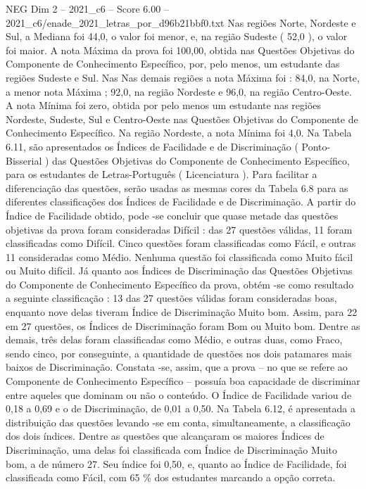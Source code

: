 \begin{textsample}{NEG Dim 2 – 2021\_c6 – Score 6.00 – 2021\_c6/enade\_2021\_letras\_por\_d96b21bbf0.txt}
Nas regiões Norte, Nordeste e Sul, a Mediana foi 44,0, o valor foi menor, e, na região Sudeste ( 52,0 ), o valor foi maior.
A nota Máxima da prova foi 100,00, obtida nas Questões Objetivas do Componente de Conhecimento Específico, por, pelo menos, um estudante das regiões Sudeste e Sul.
Nas Nas demais regiões a nota Máxima foi : 84,0, na Norte, a menor nota Máxima ; 92,0, na região Nordeste e 96,0, na região Centro-Oeste.
A nota Mínima foi zero, obtida por pelo menos um estudante nas regiões Nordeste, Sudeste, Sul e Centro-Oeste nas Questões Objetivas do Componente de Conhecimento Específico.
Na região Nordeste, a nota Mínima foi 4,0.
Na Tabela 6.11, são apresentados os Índices de Facilidade e de Discriminação ( Ponto-Bisserial ) das Questões Objetivas do Componente de Conhecimento Específico, para os estudantes de Letras-Português ( Licenciatura ).
Para facilitar a diferenciação das questões, serão usadas as mesmas cores da Tabela 6.8 para as diferentes classificações dos Índices de Facilidade e de Discriminação.
A partir do Índice de Facilidade obtido, pode -se concluir que quase metade das questões objetivas da prova foram consideradas Difícil : das 27 questões válidas, 11 foram classificadas como Difícil.
Cinco questões foram classificadas como Fácil, e outras 11 consideradas como Médio.
Nenhuma questão foi classificada como Muito fácil ou Muito difícil.
Já quanto aos Índices de Discriminação das Questões Objetivas do Componente de Conhecimento Específico da prova, obtém -se como resultado a seguinte classificação : 13 das 27 questões válidas foram consideradas boas, enquanto nove delas tiveram Índice de Discriminação Muito bom.
Assim, para 22 em 27 questões, os Índices de Discriminação foram Bom ou Muito bom.
Dentre as demais, três delas foram classificadas como Médio, e outras duas, como Fraco, sendo cinco, por conseguinte, a quantidade de questões nos dois patamares mais baixos de Discriminação.
Constata -se, assim, que a prova – no que se refere ao Componente de Conhecimento Específico – possuía boa capacidade de discriminar entre aqueles que dominam ou não o conteúdo.
O Índice de Facilidade variou de 0,18 a 0,69 e o de Discriminação, de 0,01 a 0,50.
Na Tabela 6.12, é apresentada a distribuição das questões levando -se em conta, simultaneamente, a classificação dos dois índices.
Dentre as questões que alcançaram os maiores Índices de Discriminação, uma delas foi classificada com Índice de Discriminação Muito bom, a de número 27.
Seu índice foi 0,50, e, quanto ao Índice de Facilidade, foi classificada como Fácil, com 65 \% dos estudantes marcando a opção correta.

\end{textsample}
